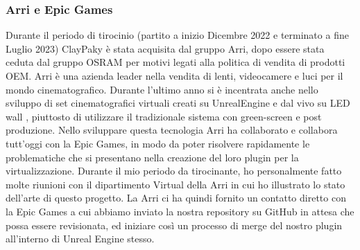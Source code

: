 \documentclass[main.tex]{subfiles}
\begin{document}
\subsubsection{Arri e Epic Games}\label{subsec:6_1_Arri-EG}
Durante il periodo di tirocinio (partito a inizio Dicembre 2022 e terminato a fine Luglio 2023) ClayPaky è stata acquisita dal gruppo Arri, dopo essere stata ceduta dal gruppo OSRAM per motivi legati alla politica di vendita di prodotti OEM. Arri è una azienda leader nella vendita di lenti, videocamere e luci per il mondo cinematografico. Durante l'ultimo anno si è incentrata anche nello sviluppo di set cinematografici virtuali creati su UnrealEngine e  dal vivo su LED wall \cite{virtualProduction}, piuttosto di utilizzare il tradizionale sistema con green-screen e post produzione. Nello sviluppare questa tecnologia Arri ha collaborato e collabora tutt'oggi con la Epic Games, in modo da poter risolvere rapidamente le problematiche che si presentano nella creazione del loro plugin per la virtualizzazione. Durante il mio periodo da tirocinante, ho personalmente fatto molte riunioni con il dipartimento Virtual della Arri in cui ho illustrato lo stato dell'arte di questo progetto. La Arri ci ha quindi fornito un contatto diretto con la Epic Games a cui abbiamo inviato la nostra repository su GitHub \cite{gdtfImporterPlugin} in attesa che possa essere revisionata, ed iniziare così un processo di merge del nostro plugin all'interno di Unreal Engine stesso.

\clearpage
\end{document}
